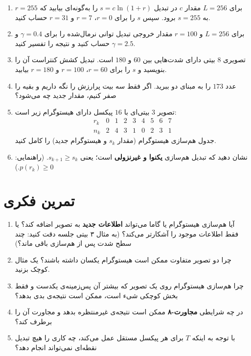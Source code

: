 \documentclass[11pt,a4paper]{article}
\begin{document}
	\begin{enumerate}
		\item برای $L=256$ مقدار $c$ در تبدیل $s=c\ln(1+r)$ را به‌گونه‌ای بیابید که $r=255$ به $s=255$ برود.
		سپس $s$ را برای $r=0$، $r=7$ و $r=31$ حساب کنید.
		\item برای $L=256$ و $r=100$ مقدار خروجی تبدیل توانی نرمال‌شده را برای
		$\gamma=0.4$ و $\gamma=2.5$ حساب کنید و نتیجه را تفسیر کنید.
		\item تصویری $8$ بیتی دارای شدت‌هایی بین $60$ و $180$ است. تبدیل کشش کنتراست آن
		را بنویسید و $s$ را برای $r=60$، $r=100$ و $r=180$ بیابید.
		\item عدد $173$ را به مبنای دو ببرید. اگر فقط سه بیت پرارزش را نگه داریم و بقیه را صفر کنیم، مقدار جدید چه می‌شود؟
		\item تصویر $3$ بیتی‌ای با $16$ پیکسل دارای هیستوگرام زیر است:
		\[
		\begin{array}{c|cccccccc}
			r_k & 0 & 1 & 2 & 3 & 4 & 5 & 6 & 7\\
			\hline
			n_k & 2 & 4 & 3 & 1 & 0 & 2 & 3 & 1
		\end{array}
		\]
		جدول هم‌سازی هیستوگرام (مقدار $s_k$ و هیستوگرام جدید) را کامل کنید.
		\item نشان دهید که تبدیل هم‌سازی \textbf{یکنوا و غیرنزولی} است؛ یعنی $s_{k+1}\geq s_k$. (راهنمایی: $p(r_k)\geq0$.)
	\end{enumerate}
	
	
	\section{تمرین فکری}
	
	\begin{enumerate}
		\item آیا هم‌سازی هیستوگرام یا گاما می‌تواند \textbf{اطلاعات جدید} به تصویر اضافه کند؟
		یا فقط اطلاعات موجود را آشکارتر می‌کند؟ (به مثال ۳ بیتی جلسه دقت کنید: چند سطح شدت پس از هم‌سازی باقی ماند؟)
		\item چرا دو تصویر متفاوت ممکن است هیستوگرام یکسان داشته باشند؟ یک مثال کوچک بزنید.
		\item چرا هم‌سازی هیستوگرام روی یک تصویر که بیشتر آن پس‌زمینه‌ی یکدست و فقط بخش کوچکی شیء است،
		ممکن است نتیجه‌ی بدی بدهد؟
		\item در چه شرایطی \textbf{مجاورت-۸} ممکن است نتیجه‌ی غیرمنتظره بدهد و مجاورت  آن را برطرف کند؟
		\item با توجه به اینکه $T$ برای هر پیکسل مستقل عمل می‌کند، چه کاری را
		هیچ تبدیل نقطه‌ای نمی‌تواند انجام دهد؟
	\end{enumerate}
	
\end{document}
